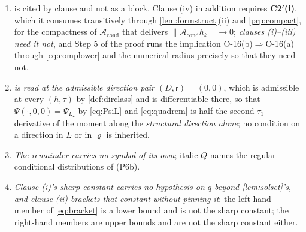 \begin{remark}\label{rem:sharpquadread}
\begin{enumerate}
\item[(1)]  is cited by clause and not as a block. Clause \textup{(iv)} in
addition requires \textbf{C2$'$(i)}, which it consumes transitively through
\cref{lem:formstruct}\textup{(ii)} and \cref{prp:compact}, for the compactness of
$\mathcal A_{\mathrm{cond}}$ that delivers $\|\mathcal A_{\mathrm{cond}}h_k\|\to0$; \emph{clauses
\textup{(i)}--\textup{(iii)} need it not}, and Step 5 of the proof runs the implication
O-16\textup{(b)}$\Rightarrow$O-16\textup{(a)} through \eqref{eq:complower} and the numerical radius
precisely so that they need not.
\item[(2)] \emph{ is read at the admissible direction pair $(D,\mathsf r)=(0,0)$},
which is admissible at every $(h,\bar\tau)$ by \cref{def:dirclass} and is differentiable there, so that
$\Psi(\cdot,0,0)=\Psi_{L_\star}$ by \eqref{eq:PsiL} and \eqref{eq:quadrem} is half the second
$\tau_1$-derivative of the moment along the \emph{structural direction alone}; no condition on a
direction in $L$ or in $\varrho$ is inherited.
\item[(3)] \emph{The remainder carries no symbol of its own}; italic $Q$ names the regular conditional
distributions of \textup{(P6b)}.
\item[(4)] \emph{Clause \textup{(i)}'s sharp constant carries no hypothesis on $q$ beyond
\cref{lem:solset}'s, and clause \textup{(ii)} brackets that constant without pinning it}: the left-hand
member of \eqref{eq:bracket} is a lower bound and is not the sharp constant; the right-hand members are
upper bounds and are not the sharp constant either.
\end{enumerate}
\end{remark}

